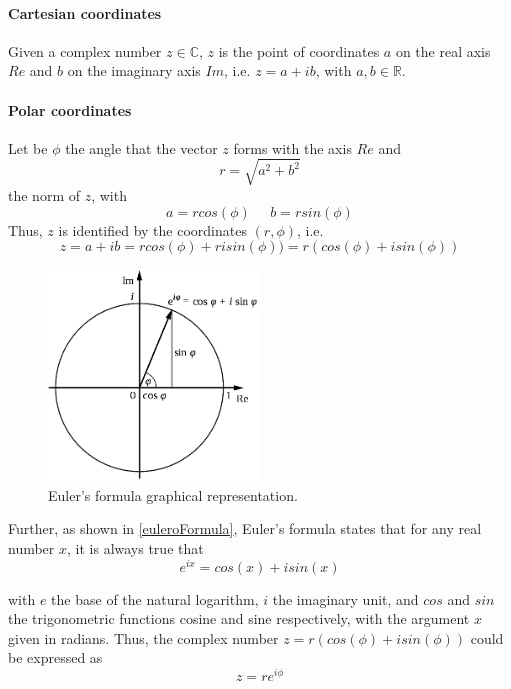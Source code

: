 \documentclass[a4paper,10pt]{article}
\begin{document}
\paragraph{Cartesian coordinates} Given a complex number $z \in \mathbb{C}$, $z$ is the point of coordinates $a$ on the real axis $Re$ and $b$ on the imaginary axis $Im$, i.e. $z = a + ib$, with $a, b \in \mathbb{R}$.

\paragraph{Polar coordinates} Let be $\phi$ the angle that the vector $z$ forms with the axis $Re$ and 
$$r = \sqrt{a^2 + b^2}$$
the norm of $z$, with 
$$a = rcos(\phi) \; \; \; \; \; b = rsin(\phi)$$
Thus, $z$ is identified by the coordinates $(r, \phi)$, i.e. 
$$z = a + ib = rcos(\phi) + risin(\phi)) = r(cos(\phi) + isin(\phi))$$

\begin{figure}[!htb]
\begin{center}
\includegraphics[width=2.2in]{images/euleroFormula.png}
\caption{Euler's formula graphical representation.}
\label{euleroFormula}
\end{center}
\end{figure}

Further, as shown in \autoref{euleroFormula}, Euler's formula states that for any real number $x$, it is always true that
\begin{equation}
e^{ix} = cos(x) + isin(x)
\label{eq:euleroFormula}
\end{equation}

with $e$ the base of the natural logarithm, $i$ the imaginary unit, and $cos$ and $sin$ the trigonometric functions cosine and sine respectively, with the argument $x$ given in radians. Thus, the complex number $z = r(cos(\phi) + isin(\phi))$ could be expressed as
\begin{equation}
z = r e^{i\phi}
\label{eq:complexNumberPolar}
\end{equation}
\end{document}
